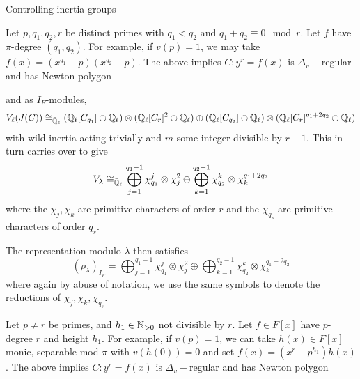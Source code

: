 \documentclass[11pt,a4paper]{article}
\newcommand{\Dv}{\Delta_v}
\begin{document}
\begin{section}{Controlling inertia groups}
\begin{example}
\label{example_Golbach}
Let $p,q_1,q_2,r$ be distinct primes with $q_1 < q_2$ and $q_1+q_2 \equiv 0 \mod{r}$. Let $f$ have $\pi$-degree $(q_1,q_2)$. For example, if $v(p)=1$, we may take $f(x) = (x^{q_1}-p)(x^{q_2}-p)$. The above implies $C\colon y^r=f(x)$ is $\Dv-$regular and has Newton polygon
\begin{center}
\end{center}
and as $I_F$-modules, \[V_\ell(J(C)) \cong_{\Bar{\mathbb{Q}}_\ell} (\mathbb{Q}_\ell[C_{q_1}] \ominus \mathbb{Q}_\ell)\otimes (\mathbb{Q}_\ell[C_{r}]^{2} \ominus \mathbb{Q}_\ell) \oplus (\mathbb{Q}_\ell[C_{q_2}] \ominus \mathbb{Q}_\ell)\otimes (\mathbb{Q}_\ell[C_{r}]^{q_1+2q_2} \ominus \mathbb{Q}_\ell)\]
with wild inertia acting trivially and $m$ some integer divisible by $r-1$. This in turn carries over to give
\[V_\lambda \cong_{\Bar{\mathbb{Q}}_\ell}  \bigoplus_{j=1}^{q_1-1} \chi_{q_1}^{j} \otimes \chi_j^2 \oplus \bigoplus_{k=1}^{q_2-1} \chi_{q_2}^{k} \otimes \chi_k^{q_1+2q_2}\]
where the $\chi_j, \chi_k$ are primitive characters of order $r$ and the $\chi_{q_s}$ are primitive characters of order $q_s$.

The representation modulo $\lambda$ then satisfies
\[ (\rho_\lambda)_{I_F} =  \bigoplus_{j=1}^{q_1-1} \chi_{q_1}^{j} \otimes \chi_j^2 \oplus \bigoplus_{k=1}^{q_2-1} \chi_{q_2}^{k} \otimes \chi_k^{q_1 + 2q_2}
\]
where again by abuse of notation, we use the same symbols to denote the reductions of $\chi_{j},\chi_k, \chi_{q_s}$.
\end{example}

\begin{example}
\label{example_transvection}
Let $p \neq r$ be primes, and $h_1 \in \mathbb{N}_{>0}$ not divisible by $r$. Let $f \in F[x]$ have $p$-degree $r$ and height $h_1$. For example, if $v(p)=1$, we can take $h(x) \in F[x]$ monic, separable mod $\pi$ with $v(h(0))=0$ and set $f(x) = (x^r-p^{h_1})h(x)$. The above implies $C\colon y^r=f(x)$ is $\Dv-$regular and has Newton polygon
\begin{center}
\end{center}
\end{example}
\end{section}
\end{document}
